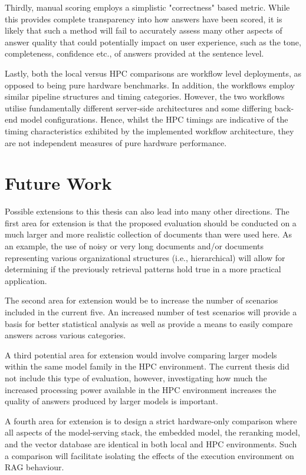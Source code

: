 Thirdly, manual scoring employs a simplistic "correctness" based metric. While this provides complete transparency into how answers have been scored, it is likely that such a method will fail to accurately assess many other aspects of answer quality that could potentially impact on user experience, such as the tone, completeness, confidence etc., of answers provided at the sentence level.

Lastly, both the local versus \ac{HPC} comparisons are workflow level deployments, as opposed to being pure hardware benchmarks. In addition, the workflows employ similar pipeline structures and timing categories. However, the two workflows utilise fundamentally different server-side architectures and some differing back-end model configurations. Hence, whilst the \ac{HPC} timings are indicative of the timing characteristics exhibited by the implemented workflow architecture, they are not independent measures of pure hardware performance.

\section{Future Work}

Possible extensions to this thesis can also lead into many other directions. The first area for extension is that the proposed evaluation should be conducted on a much larger and more realistic collection of documents than were used here. As an example, the use of noisy or very long documents and/or documents representing various organizational structures (i.e., hierarchical) will allow for determining if the previously retrieval patterns hold true in a more practical application.

The second area for extension would be to increase the number of scenarios included in the current five. An increased number of test scenarios will provide a basis for better statistical analysis as well as provide a means to easily compare answers across various categories.

A third potential area for extension would involve comparing larger models within the same model family in the \ac{HPC} environment. The current thesis did not include this type of evaluation, however, investigating how much the increased processing power available in the \ac{HPC} environment increases the quality of answers produced by larger models is important.

A fourth area for extension is to design a strict hardware-only comparison where all aspects of the model-serving stack, the embedded model, the reranking model, and the vector database are identical in both local and \ac{HPC} environments. Such a comparison will facilitate isolating the effects of the execution environment on RAG behaviour.

